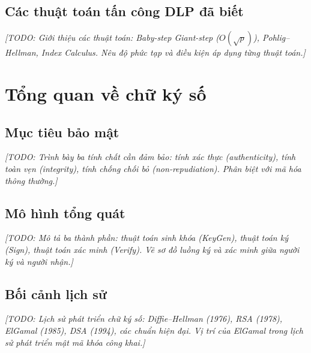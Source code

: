 \documentclass[../DoAn.tex]{subfiles}
\begin{document}
\subsection{Các thuật toán tấn công DLP đã biết}
\label{subsec:dlp-attacks}

\textit{[TODO: Giới thiệu các thuật toán: Baby-step Giant-step ($O(\sqrt{p})$), Pohlig--Hellman, Index Calculus. Nêu độ phức tạp và điều kiện áp dụng từng thuật toán.]}

\section{Tổng quan về chữ ký số}
\label{section:1.3}

\subsection{Mục tiêu bảo mật}
\label{section:1.3.1}
\textit{[TODO: Trình bày ba tính chất cần đảm bảo: tính xác thực (authenticity), tính toàn vẹn (integrity), tính chống chối bỏ (non-repudiation). Phân biệt với mã hóa thông thường.]}

\subsection{Mô hình tổng quát}
\label{section:1.3.2}
\textit{[TODO: Mô tả ba thành phần: thuật toán sinh khóa (KeyGen), thuật toán ký (Sign), thuật toán xác minh (Verify). Vẽ sơ đồ luồng ký và xác minh giữa người ký và người nhận.]}

\subsection{Bối cảnh lịch sử}
\label{section:1.3.3}
\textit{[TODO: Lịch sử phát triển chữ ký số: Diffie--Hellman (1976), RSA (1978), ElGamal (1985), DSA (1994), các chuẩn hiện đại. Vị trí của ElGamal trong lịch sử phát triển mật mã khóa công khai.]}
\end{document}
